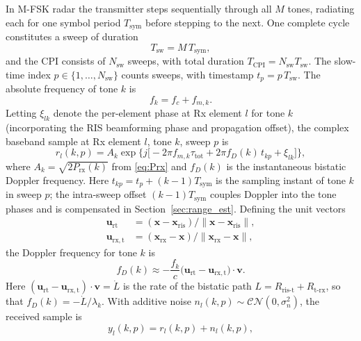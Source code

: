 \documentclass[journal]{IEEEtran}
\begin{document}
In M-FSK radar the transmitter steps sequentially through all $M$ tones,
radiating each for one symbol period $T_{\mathrm{sym}}$ before stepping to
the next. One complete cycle constitutes a sweep of duration
\begin{equation}
T_{\mathrm{sw}} = M\,T_{\mathrm{sym}},
\label{eq:Tsw}
\end{equation}
and the CPI consists of $N_{\mathrm{sw}}$ sweeps, with total duration
$T_{\mathrm{CPI}} = N_{\mathrm{sw}} T_{\mathrm{sw}}$. The slow-time index
$p \in \{1,\dots,N_{\mathrm{sw}}\}$ counts sweeps, with timestamp
$t_p = p\,T_{\mathrm{sw}}$. The absolute frequency of tone $k$ is
\begin{equation}
f_k = f_c + f_{m,k}.
\label{eq:fk}
\end{equation}
Letting $\xi_{lk}$ denote the per-element phase at Rx element $l$ for tone
$k$ (incorporating the RIS beamforming phase and propagation offset), the
complex baseband sample at Rx element $l$, tone $k$, sweep $p$ is
\begin{equation}
r_l(k,p) = A_k \exp\!\big\{j\big[-2\pi f_{m,k}\tau_{\mathrm{tot}}
+ 2\pi f_D(k)\,t_{kp} + \xi_{lk}\big]\big\},
\label{eq:rlkp}
\end{equation}
where $A_k = \sqrt{2P_{\mathrm{rx}}(k)}$ from \eqref{eq:Prx} and $f_D(k)$ is
the instantaneous bistatic Doppler frequency. Here $t_{kp} = t_p + (k-1)T_{\mathrm{sym}}$ is the sampling instant of tone $k$ in sweep $p$; the intra-sweep offset $(k-1)T_{\mathrm{sym}}$ couples Doppler into the tone phases and is compensated in Section~\ref{sec:range_est}.
Defining the unit vectors
\begin{align}
\bm{u}_{\mathrm{rt}} &= (\bm{x} - \bm{x}_{\mathrm{ris}})/
\|\bm{x} - \bm{x}_{\mathrm{ris}}\|,
\label{eq:urt}\\
\bm{u}_{\mathrm{rx,t}} &= (\bm{x}_{\mathrm{rx}} - \bm{x})/
\|\bm{x}_{\mathrm{rx}} - \bm{x}\|,
\label{eq:urxt}
\end{align}
the Doppler frequency for tone $k$ is
\begin{equation}
f_D(k) \approx -\frac{f_k}{c}\big(\bm{u}_{\mathrm{rt}} - \bm{u}_{\mathrm{rx,t}}\big)\!\cdot\!\bm{v}.
\label{eq:fd}
\end{equation}
Here $(\bm{u}_{\mathrm{rt}} - \bm{u}_{\mathrm{rx,t}})\!\cdot\!\bm{v} = \dot L$ is the rate of the bistatic path $L = R_{\mathrm{ris\text{-}t}} + R_{\mathrm{t\text{-}rx}}$, so that $f_D(k) = -\dot L/\lambda_k$.
With additive noise $n_l(k,p) \sim \mathcal{CN}(0,\sigma_n^2)$, the received
sample is
\begin{equation}
y_l(k,p) = r_l(k,p) + n_l(k,p),
\label{eq:ylkp}
\end{equation}
\end{document}
